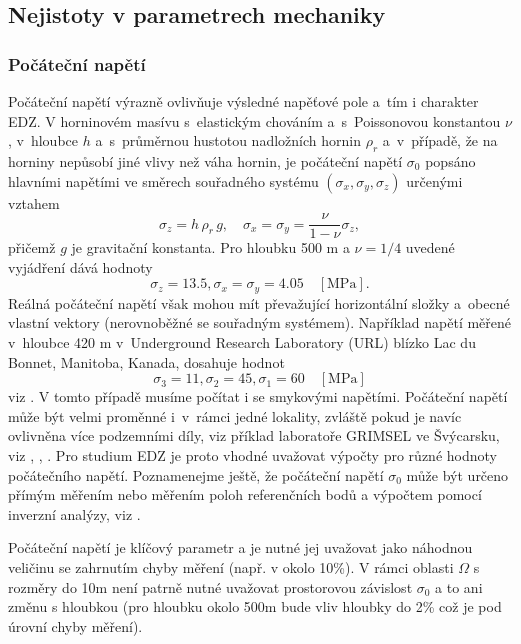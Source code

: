 \documentclass{article}
\begin{document}
\subsection{Nejistoty v parametrech mechaniky}

\subsubsection{Počáteční napětí}
\label{sec:sigma0}
Počáteční napětí výrazně ovlivňuje výsledné napěťové pole a~tím i charakter EDZ.
V horninovém masívu s~elastickým chováním a~s~Poissonovou konstantou $\nu$, v~hloubce $h$ a~s~průměrnou hustotou nadložních hornin $\rho_{r}$ a~v~případě,
že na horniny nepůsobí jiné vlivy než váha hornin, je počáteční napětí $\sigma_0$
popsáno hlavními napětími ve směrech souřadného systému $(\sigma_x, \sigma_y, \sigma_z)$ určenými vztahem
\begin{equation}
	\sigma_z = h\,\rho_{r}\, g, \quad \sigma_x = \sigma_y = \frac{\nu}{1-\nu} \sigma_z,
\end{equation}
přičemž $g$ je gravitační konstanta. Pro hloubku 500 m a $\nu = 1/4$ uvedené vyjádření dává hodnoty
$$
	\sigma_z = 13.5, \sigma_x = \sigma_y = 4.05\quad [\mathrm{MPa}].
$$
Reálná počáteční napětí však mohou mít převažující horizontální složky a~obecné vlastní vektory (nerovnoběžné se souřadným systémem). Například napětí měřené v~hloubce 420 m v~Underground Research Laboratory (URL) blízko Lac du Bonnet, Manitoba, Kanada, dosahuje hodnot
$$
	\sigma_3 = 11, \sigma_2 = 45, \sigma_1 = 60\quad [\mathrm{MPa}]
$$
viz \cite{Rutqvist2009}. V tomto případě musíme počítat i se smykovými napětími. Počáteční napětí může být velmi proměnné i~v~rámci jedné lokality, zvláště pokud je navíc ovlivněna více podzemními díly, viz příklad laboratoře GRIMSEL ve Švýcarsku, viz \cite{Krietsch2019},
\cite{Stas2016}, \cite{Rutqvist2004}. Pro studium EDZ je proto vhodné uvažovat výpočty pro různé hodnoty počátečního napětí.
Poznamenejme  ještě, že počáteční napětí $\sigma_0$ může být určeno přímým měřením nebo měřením poloh referenčních bodů 
a výpočtem pomocí inverzní analýzy, viz \cite{Malik2021}.

Počáteční napětí je klíčový parametr a je nutné jej uvažovat jako náhodnou veličinu se zahrnutím 
chyby měření (např. v \cite{Herget1973} okolo 10\%). V rámci oblasti $\Omega$ s rozměry do 10m není patrně nutné uvažovat prostorovou 
závislost $\sigma_0$ a to ani změnu s hloubkou (pro hloubku okolo 500m bude vliv hloubky do 2\% což je pod úrovní chyby měření).
\end{document}
